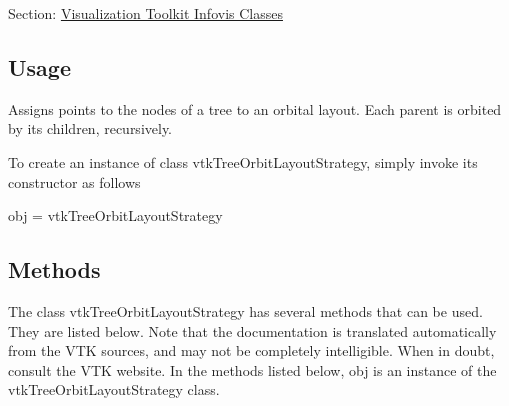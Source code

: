 Section\-: \hyperlink{sec_vtkinfovis}{Visualization Toolkit Infovis Classes} \hypertarget{vtkwidgets_vtkxyplotwidget_Usage}{}\subsection{Usage}\label{vtkwidgets_vtkxyplotwidget_Usage}
Assigns points to the nodes of a tree to an orbital layout. Each parent is orbited by its children, recursively.

To create an instance of class vtk\-Tree\-Orbit\-Layout\-Strategy, simply invoke its constructor as follows \begin{DoxyVerb}  obj = vtkTreeOrbitLayoutStrategy
\end{DoxyVerb}
 \hypertarget{vtkwidgets_vtkxyplotwidget_Methods}{}\subsection{Methods}\label{vtkwidgets_vtkxyplotwidget_Methods}
The class vtk\-Tree\-Orbit\-Layout\-Strategy has several methods that can be used. They are listed below. Note that the documentation is translated automatically from the V\-T\-K sources, and may not be completely intelligible. When in doubt, consult the V\-T\-K website. In the methods listed below, {\ttfamily obj} is an instance of the vtk\-Tree\-Orbit\-Layout\-Strategy class. 
